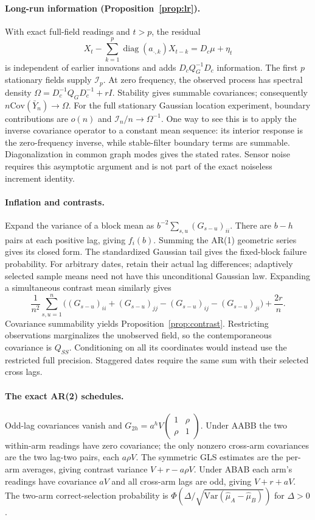 \documentclass[sigconf,review,anonymous]{acmart}
\newcommand{\Var}{\mathrm{Var}}
\newcommand{\Cov}{\mathrm{Cov}}
\newcommand{\diag}{\operatorname{diag}}
\newcommand{\I}{\mathcal{I}}
\begin{document}
\paragraph{Long-run information (Proposition~\ref{prop:lr}).}
With exact full-field readings and $t>p$, the residual
\[
X_t-\sum_{k=1}^p\diag(a_{\cdot,k})X_{t-k}=D_c\mu+\eta_t
\]
is independent of earlier innovations and adds $D_cQ_G^{-1}D_c$ information. The first $p$ stationary fields supply $\I_p$. At zero frequency, the observed process has spectral density $\Omega=D_c^{-1}Q_GD_c^{-1}+rI$. Stability gives summable covariances; consequently $n\Cov(\bar Y_n)\to\Omega$. For the full stationary Gaussian location experiment, boundary contributions are $o(n)$ and $\I_n/n\to\Omega^{-1}$. One way to see this is to apply the inverse covariance operator to a constant mean sequence: its interior response is the zero-frequency inverse, while stable-filter boundary terms are summable. Diagonalization in common graph modes gives the stated rates. Sensor noise requires this asymptotic argument and is not part of the exact noiseless increment identity.

\paragraph{Inflation and contrasts.}
Expand the variance of a block mean as $b^{-2}\sum_{s,u}(G_{s-u})_{ii}$. There are $b-h$ pairs at each positive lag, giving $f_i(b)$. Summing the AR(1) geometric series gives its closed form. The standardized Gaussian tail gives the fixed-block failure probability. For arbitrary dates, retain their actual lag differences; adaptively selected sample means need not have this unconditional Gaussian law. Expanding a simultaneous contrast mean similarly gives
\[
\frac1{n^2}\sum_{s,u=1}^n
\big((G_{s-u})_{ii}+(G_{s-u})_{jj}-(G_{s-u})_{ij}-(G_{s-u})_{ji}\big)+\frac{2r}{n}.
\]
Covariance summability yields Proposition~\ref{prop:contrast}. Restricting observations marginalizes the unobserved field, so the contemporaneous covariance is $Q_{SS}$. Conditioning on all its coordinates would instead use the restricted full precision. Staggered dates require the same sum with their selected cross lags.

\paragraph{The exact AR(2) schedules.}
Odd-lag covariances vanish and $G_{2h}=a^hV\left(\begin{smallmatrix}1&\rho\\\rho&1\end{smallmatrix}\right)$. Under AABB the two within-arm readings have zero covariance; the only nonzero cross-arm covariances are the two lag-two pairs, each $a\rho V$. The symmetric GLS estimates are the per-arm averages, giving contrast variance $V+r-a\rho V$. Under ABAB each arm's readings have covariance $aV$ and all cross-arm lags are odd, giving $V+r+aV$. The two-arm correct-selection probability is $\Phi(\Delta/\sqrt{\Var(\hat\mu_A-\hat\mu_B)})$ for $\Delta>0$.
\end{document}

